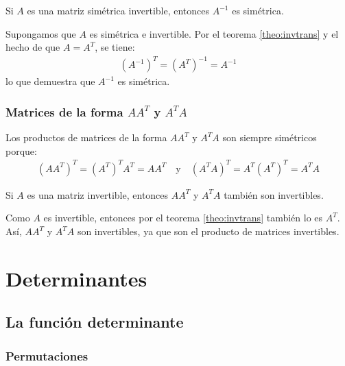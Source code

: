 \documentclass[a4paper,12pt]{article}
\begin{document}
\begin{theorem}
  Si $A$ es una matriz simétrica invertible, entonces $A^{-1}$ es simétrica.
  \label{theo:matrsiminv}
\end{theorem}

\demo Supongamos que $A$ es simétrica e invertible. Por el teorema
\ref{theo:invtrans} y el hecho de que $A=A^T$, se tiene:
\begin{align*}
  \left( A^{-1} \right)^T=\left( A^T \right)^{-1}=A^{-1}
\end{align*}
lo que demuestra que $A^{-1}$ es simétrica.

\subsubsection{Matrices de la forma $AA^T$ y $A^TA$}

Los productos de matrices de la forma $AA^T$ y $A^TA$ son siempre simétricos
porque:
\begin{align*}
  \left( AA^T \right)^T = \left( A^T \right)^TA^T = AA^T \quad \mbox{y} \quad
  \left( A^TA \right)^T=A^T\left( A^T \right)^T=A^TA
\end{align*}

\begin{theorem}
  Si $A$ es una matriz invertible, entonces $AA^T$ y $A^TA$ también son
  invertibles.
  \label{theo:invATA}
\end{theorem}

\demo Como $A$ es invertible, entonces por el teorema \ref{theo:invtrans}
también lo es $A^T$. Así, $AA^T$ y $A^TA$ son invertibles, ya que son el
producto de matrices invertibles.


\newpage
\section{Determinantes}

\subsection{La función determinante}

\subsubsection{Permutaciones}
\end{document}

